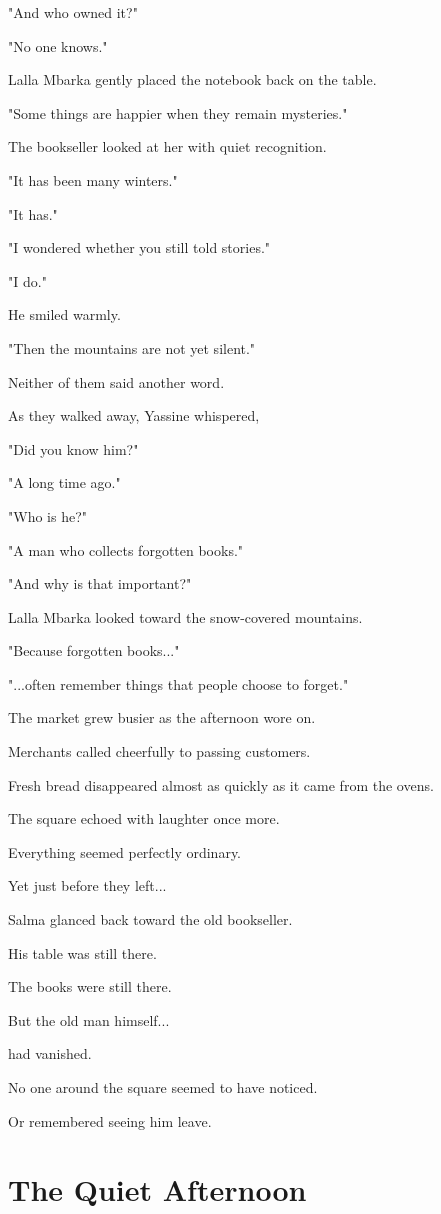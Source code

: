 \documentclass[12pt,openany]{book}
\begin{document}
"And who owned it?"

"No one knows."

Lalla Mbarka gently placed the notebook back on the table.

"Some things are happier when they remain mysteries."

The bookseller looked at her with quiet recognition.

"It has been many winters."

"It has."

"I wondered whether you still told stories."

"I do."

He smiled warmly.

"Then the mountains are not yet silent."

Neither of them said another word.

As they walked away, Yassine whispered,

"Did you know him?"

"A long time ago."

"Who is he?"

"A man who collects forgotten books."

"And why is that important?"

Lalla Mbarka looked toward the snow-covered mountains.

"Because forgotten books..."

"...often remember things that people choose to forget."

The market grew busier as the afternoon wore on.

Merchants called cheerfully to passing customers.

Fresh bread disappeared almost as quickly as it came from the ovens.

The square echoed with laughter once more.

Everything seemed perfectly ordinary.

Yet just before they left...

Salma glanced back toward the old bookseller.

His table was still there.

The books were still there.

But the old man himself...

had vanished.

No one around the square seemed to have noticed.

Or remembered seeing him leave.
\section*{The Quiet Afternoon}
\end{document}
